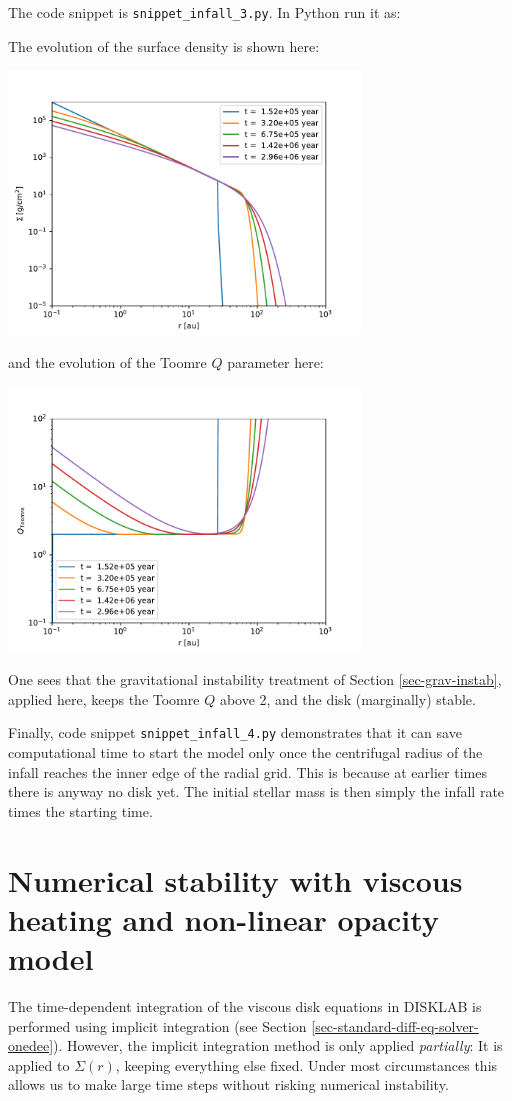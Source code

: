 \documentclass{book}
\newcommand{\code}[1]{{\small\tt #1}}
\begin{document}
The code snippet is
\code{snippet\_infall\_3.py}. In Python run it as:
\begin{codebox}
\end{codebox}
The evolution of the surface density is shown here:\\
\centerline{\includegraphics[width=0.7\textwidth]{../snippets/fig_snippet_infall_3_2.pdf}}
and the evolution of the Toomre $Q$ parameter here:\\
\centerline{\includegraphics[width=0.7\textwidth]{../snippets/fig_snippet_infall_3_3.pdf}}
One sees that the gravitational instability treatment of
Section \ref{sec-grav-instab}, applied here, keeps the Toomre
$Q$ above 2, and the disk (marginally) stable.

Finally, code snippet \code{snippet\_infall\_4.py} demonstrates that it can save
computational time to start the model only once the centrifugal radius of the
infall reaches the inner edge of the radial grid. This is because at earlier times
there is anyway no disk yet. The initial stellar mass is then simply the infall
rate times the starting time. 

\section{Numerical stability with viscous heating and non-linear opacity model}
\label{sec-numstab-vischeat-opac-evol}
%
The time-dependent integration of the viscous disk equations in {\sf DISKLAB} is
performed using implicit integration (see Section
\ref{sec-standard-diff-eq-solver-onedee}). However, the implicit integration
method is only applied {\em partially}: It is applied to $\Sigma(r)$, keeping
everything else fixed. Under most circumstances this allows us to make
large time steps without risking numerical instability.
\end{document}
